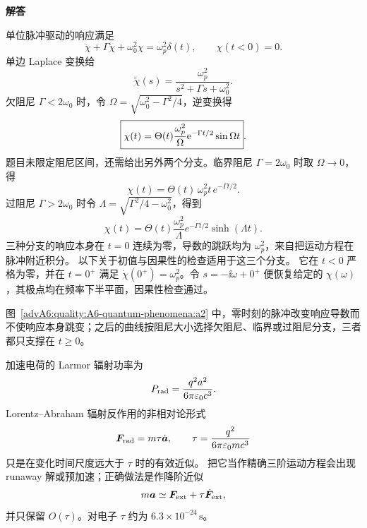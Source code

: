 \begin{advsolution}
\begin{center}\begin{minipage}{.96\linewidth}\centering
\raggedright{\bfseries\color{DeepBlue}解答}\par\smallskip\centering

\label{advA6:quality:A6-quantum-phenomena:a2}
\end{minipage}\end{center}

单位脉冲驱动的响应满足
\[
 \ddot\chi+\Gamma\dot\chi+\omega_0^2\chi
 =\omega_p^2\delta(t),\qquad \chi(t<0)=0.
\]
单边 Laplace 变换给
\[
 \tilde\chi(s)=\frac{\omega_p^2}
 {s^2+\Gamma s+\omega_0^2}.
\]
欠阻尼 $\Gamma<2\omega_0$ 时，令
$\Omega=\sqrt{\omega_0^2-\Gamma^2/4}$，逆变换得
\[
 \boxed{\chi(t)=
 \Theta(t)\frac{\omega_p^2}{\Omega}
 \mathrm e^{-\Gamma t/2}\sin\Omega t}.
\]
题目未限定阻尼区间，还需给出另外两个分支。临界阻尼 $\Gamma=2\omega_0$ 时取 $\Omega\to0$，得
\[
 \chi(t)=\Theta(t)\,\omega_p^2t\,e^{-\Gamma t/2}.
\]
过阻尼 $\Gamma>2\omega_0$ 时令 $\Lambda=\sqrt{\Gamma^2/4-\omega_0^2}$，得到
\[
 \chi(t)=\Theta(t)\frac{\omega_p^2}{\Lambda}
 e^{-\Gamma t/2}\sinh(\Lambda t).
\]
三种分支的响应本身在 $t=0$ 连续为零，导数的跳跃均为 $\omega_p^2$，来自把运动方程在脉冲附近积分。
以下关于初值与因果性的检查适用于这三个分支。
它在 $t<0$ 严格为零，并在 $t=0^+$ 满足
$\dot\chi(0^+)=\omega_p^2$。令 $s=-\ii\omega+0^+$ 便恢复给定的
$\chi(\omega)$，其极点均在频率下半平面，因果性检查通过。

图~\ref{advA6:quality:A6-quantum-phenomena:a2} 中，零时刻的脉冲改变响应导数而不使响应本身跳变；之后的曲线按阻尼大小选择欠阻尼、临界或过阻尼分支，三者都只支撑在 $t\ge0$。
\end{advsolution}

加速电荷的 Larmor 辐射功率为
\[
 P_{\rm rad}=\frac{q^2a^2}{6\pi\varepsilon_0c^3}.
\]
Lorentz--Abraham 辐射反作用的非相对论形式
\[
 \bm{F}_{\rm rad}=m\tau\dot{\bm{a}},\qquad
 \tau=\frac{q^2}{6\pi\varepsilon_0mc^3}
\]
只是在变化时间尺度远大于 $\tau$ 时的有效近似。
把它当作精确三阶运动方程会出现 runaway 解或预加速；正确做法是作降阶近似
\[
 m\bm{a}\simeq\bm{F}_{\rm ext}+\tau\dot{\bm{F}}_{\rm ext},
\]
并只保留 $O(\tau)$。对电子 $\tau$ 约为 $6.3\times10^{-24}\,\mathrm s$。

